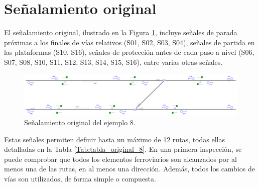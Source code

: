 \section{Señalamiento original}

    El señalamiento original, ilustrado en la Figura \ref{fig:EJ8_2}, incluye señales de parada próximas a los finales de vías relativos (S01, S02, S03, S04), señales de partida en las plataformas (S10, S16), señales de protección antes de cada paso a nivel (S06, S07, S08, S10, S11, S12, S13, S14, S15, S16), entre varias otras señales.
    
    \begin{figure}[H]
    	\centering
    	\includegraphics[width=1\textwidth]{resultados-obtenidos/ejemplo8/images/8_original.png}
    	\centering\caption{Señalamiento original del ejemplo 8.}
    	\label{fig:EJ8_2}
    \end{figure}
    
    Estas señales permiten definir hasta un máximo de 12 rutas, todas ellas detalladas en la Tabla \ref{Tab:tabla_original_8}. En una primera inspección, se puede comprobar que todos los elementos ferroviarios son alcanzados por al menos una de las rutas, en al menos una dirección. Además, todos los cambios de vías son utilizados, de forma simple o compuesta. 
    
